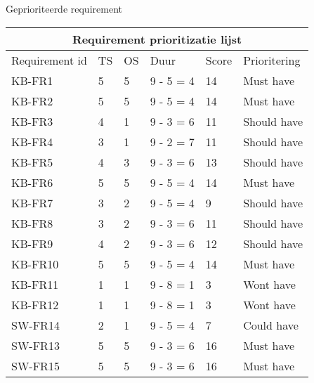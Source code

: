 \begin{graphic}
	\vspace{0.2cm}
	\captionsetup{type=table}
	\caption{Geprioriteerde requirement}
	\begin{tabular}{ |p{3cm}||p{1cm}|p{1cm}|p{1.5cm}|p{1cm}|p{2.5cm}| }
		\hline
		\multicolumn{6}{|c|}{Requirement prioritizatie lijst}       \\
		\hline
		Requirement id & TS & OS & Duur      & Score & Prioritering \\
		\hline
		KB-FR1         & 5  & 5  & 9 - 5 = 4 & 14    & Must have    \\
		KB-FR2         & 5  & 5  & 9 - 5 = 4 & 14    & Must have    \\
		KB-FR3         & 4  & 1  & 9 - 3 = 6 & 11    & Should have  \\
		KB-FR4         & 3  & 1  & 9 - 2 = 7 & 11    & Should have  \\
		KB-FR5         & 4  & 3  & 9 - 3 = 6 & 13    & Should have  \\
		KB-FR6         & 5  & 5  & 9 - 5 = 4 & 14    & Must have    \\
		KB-FR7         & 3  & 2  & 9 - 5 = 4 & 9     & Should have  \\
		KB-FR8         & 3  & 2  & 9 - 3 = 6 & 11    & Should have  \\
		KB-FR9         & 4  & 2  & 9 - 3 = 6 & 12    & Should have  \\
		KB-FR10        & 5  & 5  & 9 - 5 = 4 & 14    & Must have    \\
		KB-FR11        & 1  & 1  & 9 - 8 = 1 & 3     & Wont have    \\
		KB-FR12        & 1  & 1  & 9 - 8 = 1 & 3     & Wont have    \\
		SW-FR14        & 2  & 1  & 9 - 5 = 4 & 7     & Could have   \\
		SW-FR13        & 5  & 5  & 9 - 3 = 6 & 16    & Must have    \\
		SW-FR15        & 5  & 5  & 9 - 3 = 6 & 16    & Must have    \\
		\hline
	\end{tabular}	\label{tab:RequirementPrioritization}
	\vspace{0.2cm}
\end{graphic}

